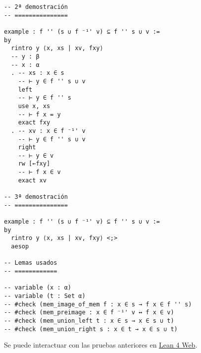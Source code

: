 \begin{verbatim}
-- 2ª demostración
-- ===============

example : f '' (s ∪ f ⁻¹' v) ⊆ f '' s ∪ v :=
by
  rintro y ⟨x, xs | xv, fxy⟩
  -- y : β
  -- x : α
  . -- xs : x ∈ s
    -- ⊢ y ∈ f '' s ∪ v
    left
    -- ⊢ y ∈ f '' s
    use x, xs
    -- ⊢ f x = y
    exact fxy
  . -- xv : x ∈ f ⁻¹' v
    -- ⊢ y ∈ f '' s ∪ v
    right
    -- ⊢ y ∈ v
    rw [←fxy]
    -- ⊢ f x ∈ v
    exact xv

-- 3ª demostración
-- ===============

example : f '' (s ∪ f ⁻¹' v) ⊆ f '' s ∪ v :=
by
  rintro y ⟨x, xs | xv, fxy⟩ <;>
  aesop

-- Lemas usados
-- ============

-- variable (x : α)
-- variable (t : Set α)
-- #check (mem_image_of_mem f : x ∈ s → f x ∈ f '' s)
-- #check (mem_preimage : x ∈ f ⁻¹' v ↔ f x ∈ v)
-- #check (mem_union_left t : x ∈ s → x ∈ s ∪ t)
-- #check (mem_union_right s : x ∈ t → x ∈ s ∪ t)
\end{verbatim}
Se puede interactuar con las pruebas anteriores en \href{https://lean.math.hhu.de/\#url=https://raw.githubusercontent.com/jaalonso/Calculemus2/main/src/Union\_con\_la\_imagen.lean}{Lean 4 Web}.

